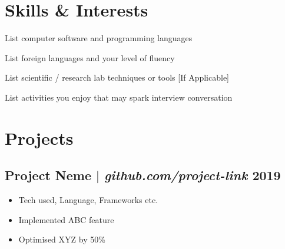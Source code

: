 \documentclass[11pt]{article} %
\begin{document}
\section{Skills \& Interests}
\begin{description}[itemsep=0pt]
	\item[Technical] List computer software and programming languages
	\item[Language] List foreign languages and your level of fluency
	\item[Laboratory] List scientific / research lab techniques or tools [If Applicable]
	\item[Interests] List activities you enjoy that may spark interview conversation
\end{description}

\section{Projects}
\subsection{Project Neme $|$ \normalfont\textit{github.com/project-link} \hfill 2019}
\begin{itemize}
  \item Tech used, Language, Frameworks etc.
  \item Implemented ABC feature
  \item Optimised XYZ by 50\%
\end{itemize}
\end{document}
